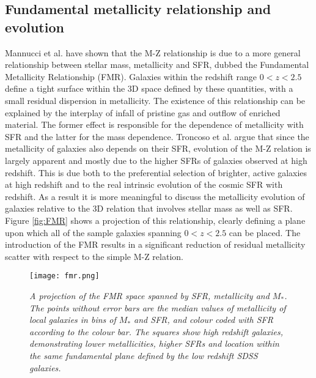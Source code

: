 \documentclass{literature}
\begin{document}
\subsection{Fundamental metallicity relationship and evolution}
Mannucci et al. \citep{Mannucci2010} have shown that the M-Z relationship is due to a more general relationship between stellar mass, metallicity and SFR, dubbed the Fundamental Metallicity Relationship (FMR). Galaxies within the redshift range $0 < z < 2.5$ define a tight surface within the 3D space defined by these quantities, with a small residual dispersion in metallicity. The existence of this relationship can be explained by the interplay of infall of pristine gas and outflow of enriched material. The former effect is responsible for the dependence of metallicity with SFR and the latter for the mass dependence. Troncoso et al. \citep{Troncoso_2014} argue that since the metallicity of galaxies also depends on their SFR, evolution of the M-Z relation is largely apparent and mostly due to the higher SFRs of galaxies observed at high redshift. This is due both to the preferential selection of brighter, active galaxies at high redshift and to the real intrinsic evolution of the cosmic SFR with redshift. As a result it is more meaningful to discuss the metallicity evolution of galaxies relative to the 3D relation that involves stellar mass as well as SFR. Figure \ref{fig:FMR} shows a projection of this relationship, clearly defining a plane upon which all of the sample galaxies spanning $0 < z < 2.5$ can be placed. The introduction of the FMR results in a significant reduction of residual metallicity scatter with respect to the simple M-Z relation. \\ 

\begin{figure}[!htp]
\centering
\texttt{[image: fmr.png]}
\caption{\footnotesize{\emph{A projection of the FMR space spanned by SFR, metallicity and $M_{*}$. The points without error bars are the median values of metallicity of local galaxies in bins of $M_{*}$ and SFR, and colour coded with SFR according to the colour bar. The squares show high redshift galaxies, demonstrating lower metallicities, higher SFRs and location within the same fundamental plane defined by the low redshift SDSS galaxies.}}}
\label{fig:steidel_bpt}
\end{figure} 
\end{document}
